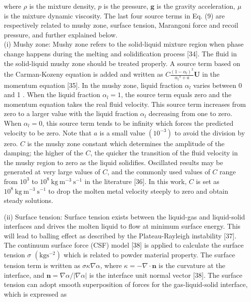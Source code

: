 \documentclass[10pt]{article}
\begin{document}
where $\rho$ is the mixture density, $p$ is the pressure, $\mathbf{g}$ is the gravity acceleration, $\mu$ is the mixture dynamic viscosity. The last four source terms in Eq. (9) are respectively related to mushy zone, surface tension, Marangoni force and recoil pressure, and further explained below.\\
(i) Mushy zone: Mushy zone refers to the solid-liquid mixture region when phase change happens during the melting and solidification process [34]. The fluid in the solid-liquid mushy zone should be treated properly. A source term based on the Carman-Kozeny equation is added and written as $C \frac{\left(1-\alpha_{l}\right)^{2}}{\alpha_{l}{ }^{3}+a} \mathbf{U}$ in the momentum equation [35]. In the mushy zone, liquid fraction $\alpha_{l}$ varies between 0 and 1 . When the liquid fraction $\alpha_{l}=1$, the source term equals zero and the momentum equation takes the real fluid velocity. This source term increases from zero to a larger value with the liquid fraction $\alpha_{l}$ decreasing from one to zero. When $\alpha_{l}=0$, this source term tends to be infinity which forces the predicted velocity to be zero. Note that $a$ is a small value $\left(10^{-3}\right)$ to avoid the division by zero. $C$ is the mushy zone constant which determines the amplitude of the damping; the higher of the $C$, the quicker the transition of the fluid velocity in the mushy region to zero as the liquid solidifies. Oscillated results may be generated at very large values of $C$, and the commonly used values of $C$ range from $10^{3}$ to $10^{8} \mathrm{~kg} \mathrm{~m}^{-3} \mathrm{~s}^{-1}$ in the literature [36]. In this work, $C$ is set as $10^{8} \mathrm{~kg} \mathrm{~m}^{-3} \mathrm{~s}^{-1}$ to drop the molten metal velocity steeply to zero and obtain steady solutions.

(ii) Surface tension: Surface tension exists between the liquid-gas and liquid-solid interfaces and drives the molten liquid to flow at minimum surface energy. This will lead to balling effect as described by the Plateau-Rayleigh instability [37]. The continuum surface force (CSF) model [38] is applied to calculate the surface tension $\sigma$ $\left(\mathrm{kg} \mathrm{s}^{-2}\right)$ which is related to powder material property. The surface tension term is written as $\sigma \kappa \nabla \alpha$, where $\kappa=-\nabla \cdot \mathbf{n}$ is the curvature at the interface, and $\mathbf{n}=\nabla \alpha /|\nabla \alpha|$ is the interface unit normal vector [38]. The surface tension can adopt smooth superposition of forces for the gas-liquid-solid interface, which is expressed as
\end{document}
